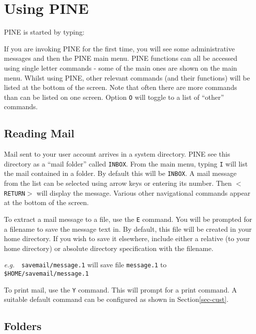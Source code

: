 \documentclass[11pt,nolof]{starlink}
\begin{document}
\scfrontmatter

\section{Using PINE}

PINE is started by typing:

\begin{terminalv}
\end{terminalv}

If you are invoking PINE for the first time, you will see some
administrative messages and then the PINE main menu. PINE functions
can all be accessed using single letter commands - some of the main
ones are shown on the main menu. Whilst using PINE, other relevant commands
(and their functions) will be listed at the bottom of the screen.
Note that often there are more commands than can be listed on one screen.
Option \texttt{O} will toggle to a list of ``other'' commands.

\subsection{Reading Mail}

Mail sent to your user account arrives in a system directory. PINE
see this directory as a ``mail folder'' called \texttt{INBOX}. From the
main menu, typing \texttt{I} will list the mail contained in a folder.
By default this will be \texttt{INBOX}. A mail message from the list
can be selected using arrow keys or entering its number. Then \texttt{$<$RETURN$>$} will display the message. Various other navigational commands
appear at the bottom of the screen.

To extract a mail message to a file, use the \texttt{E} command. You will be
prompted for a filename to save the message text in. By default, this
file will be created in your home directory. If you wish to save it
elsewhere, include either a relative (to your home directory)
or absolute directory specification with the filename.

\emph{e.g.}~~\texttt{savemail/message.1} will save file \texttt{message.1} to
\texttt{\$HOME/savemail/message.1}

To print mail, use the \texttt{Y} command. This will prompt for
a print command. A suitable default command can be configured as
shown in Section\ref{sec-cust}.

\subsection{Folders}
\end{document}
